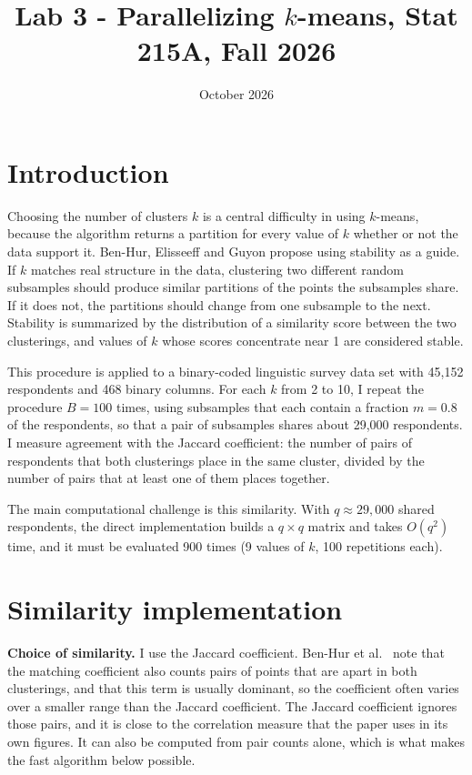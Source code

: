 \documentclass[10pt,letterpaper]{article}
\title{Lab 3 - Parallelizing $k$-means, Stat 215A, Fall 2026\vspace{-2em}}
\date{October 2026}
\begin{document}
\maketitle

\section{Introduction}\label{introduction}

Choosing the number of clusters $k$ is a central difficulty in using $k$-means, because the algorithm returns a partition for every value of $k$ whether or not the data support it. Ben-Hur, Elisseeff and Guyon \cite{benhur2002} propose using stability as a guide. If $k$ matches real structure in the data, clustering two different random subsamples should produce similar partitions of the points the subsamples share. If it does not, the partitions should change from one subsample to the next. Stability is summarized by the distribution of a similarity score between the two clusterings, and values of $k$ whose scores concentrate near 1 are considered stable.

This procedure is applied to a binary-coded linguistic survey data set with 45,152 respondents and 468 binary columns. For each $k$ from 2 to 10, I repeat the procedure $B=100$ times, using subsamples that each contain a fraction $m=0.8$ of the respondents, so that a pair of subsamples shares about 29,000 respondents. I measure agreement with the Jaccard coefficient: the number of pairs of respondents that both clusterings place in the same cluster, divided by the number of pairs that at least one of them places together.

The main computational challenge is this similarity. With $q\approx 29{,}000$ shared respondents, the direct implementation builds a $q\times q$ matrix and takes $O(q^2)$ time, and it must be evaluated 900 times (9 values of $k$, 100 repetitions each).

\section{Similarity implementation}

\textbf{Choice of similarity.} I use the Jaccard coefficient. Ben-Hur et al.\ \cite{benhur2002} note that the matching coefficient also counts pairs of points that are apart in both clusterings, and that this term is usually dominant, so the coefficient often varies over a smaller range than the Jaccard coefficient. The Jaccard coefficient ignores those pairs, and it is close to the correlation measure that the paper uses in its own figures. It can also be computed from pair counts alone, which is what makes the fast algorithm below possible.
\end{document}
